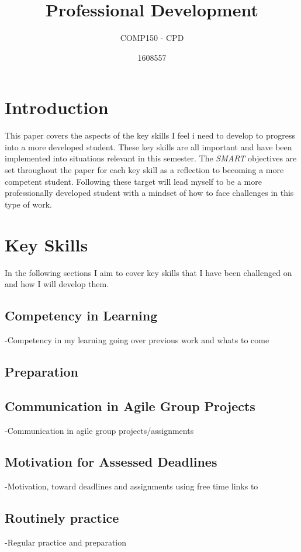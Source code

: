 \documentclass{scrartcl}
\title{Professional Development}
\subtitle{COMP150 - CPD}
\author{1608557}
\begin{document}
\maketitle
\section{Introduction}
This paper covers the aspects of the key skills I feel i need to develop to progress into a more developed student. These key skills are all important and have been implemented into situations relevant in this semester. The \textit{SMART} objectives are set throughout the paper for each key skill as a reflection to becoming a more competent student. Following these target will lead myself to be a more professionally developed student with a mindset of how to face challenges in this type of work.

\section{Key Skills}
In the following sections I aim to cover key skills that I have been challenged on and how I will develop them. 

\subsection{Competency in Learning}
-Competency in my learning
going over previous work and whats to come

\subsection{Preparation}

\subsection{Communication in Agile Group Projects}
-Communication in agile group projects/assignments

\subsection{Motivation for Assessed Deadlines}
-Motivation, toward deadlines and assignments 
using free time links to 

\subsection{Routinely practice}
-Regular practice and preparation 
\end{document}
